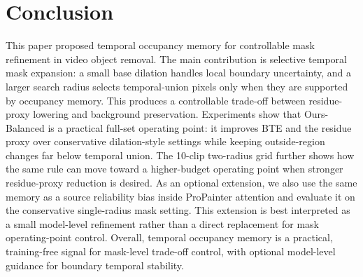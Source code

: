 \documentclass[nouppercase]{kaia}
\begin{document}
\section{Conclusion}
This paper proposed temporal occupancy memory for controllable mask refinement in video object removal. The main contribution is selective temporal mask expansion: a small base dilation handles local boundary uncertainty, and a larger search radius selects temporal-union pixels only when they are supported by occupancy memory. This produces a controllable trade-off between residue-proxy lowering and background preservation. Experiments show that Ours-Balanced is a practical full-set operating point: it improves BTE and the residue proxy over conservative dilation-style settings while keeping outside-region changes far below temporal union. The 10-clip two-radius grid further shows how the same rule can move toward a higher-budget operating point when stronger residue-proxy reduction is desired. As an optional extension, we also use the same memory as a source reliability bias inside ProPainter attention and evaluate it on the conservative single-radius mask setting. This extension is best interpreted as a small model-level refinement rather than a direct replacement for mask operating-point control. Overall, temporal occupancy memory is a practical, training-free signal for mask-level trade-off control, with optional model-level guidance for boundary temporal stability.

\clearpage

\end{document}
